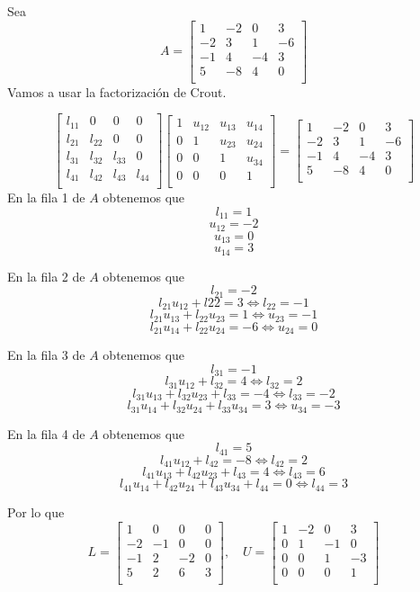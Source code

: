 \begin{ejemplo}
Sea 
\[ A = \begin{bmatrix}
1 & -2 & 0 & 3 \\
-2 & 3 & 1 & -6 \\
-1 & 4 & -4 & 3 \\
5 & -8 & 4 & 0 \\
\end{bmatrix}\]
Vamos a usar la factorización de Crout.

\[ \begin{bmatrix}
l_{11} & 0 & 0 & 0 \\
l_{21} & l_{22} & 0 & 0 \\
l_{31} & l_{32} & l_{33} & 0 \\
l_{41} & l_{42} & l_{43} & l_{44} \\
\end{bmatrix}
\begin{bmatrix}
1 & u_{12} & u_{13} & u_{14} \\
0 & 1 & u_{23} & u_{24} \\
0 & 0 & 1 & u_{34} \\
0 & 0 & 0 & 1 \\
\end{bmatrix}
=
\begin{bmatrix}
1 & -2 & 0 & 3 \\
-2 & 3 & 1 & -6 \\
-1 & 4 & -4 & 3 \\
5 & -8 & 4 & 0 \\
\end{bmatrix}\]
En la fila 1 de $A$ obtenemos que
\[l_{11} = 1\]
\[u_{12}=-2\]
\[u_{13} = 0\] 
\[u_{14} = 3\]

En la fila 2 de $A$ obtenemos que
\[l_{21}=-2\]
\[l_{21}u_{12}+l{22}=3 \Leftrightarrow l_{22}=-1\]
\[l_{21}u_{13}+l_{22}u_{23}=1 \Leftrightarrow u_{23}=-1 \]
\[l_{21}u_{14}+l_{22}u_{24}=-6 \Leftrightarrow u_{24}=0 \]

En la fila 3 de $A$ obtenemos que
\[ l_31 = -1 \]
\[ l_{31}u_{12} + l_{32} = 4 \Leftrightarrow l_{32}=2 \]
\[ l_{31}u_{13}+l_{32}u_{23}+l_{33} = -4 \Leftrightarrow l_{33}=-2 \]
\[l_{31}u_{14}+l_{32}u_{24}+l_{33}u_{34}=3 \Leftrightarrow u_{34}=-3 \]

En la fila 4 de $A$ obtenemos que
\[ l_{41} = 5 \]
\[ l_{41}u_{12}+l_{42}=-8 \Leftrightarrow l_{42}=2 \]
\[ l_{41}u_{13}+l_{42}u_{23}+l_{43}=4 \Leftrightarrow l_{43}=6\]
\[l_{41}u_{14}+l_{42}u_{24}+l_{43}u_{34}+l_{44} = 0 \Leftrightarrow l_{44}=3 \]

Por lo que
\[ L = \begin{bmatrix}
1 & 0 & 0 & 0 \\
-2 & -1 & 0 & 0 \\
-1 & 2 & -2 & 0 \\
5 & 2 & 6 & 3 \\
\end{bmatrix}, \quad
U = \begin{bmatrix}
1 & -2 & 0 & 3 \\
0 & 1 & -1 & 0 \\
0 & 0 & 1 & -3 \\
0 & 0 & 0 & 1 \\
\end{bmatrix}\]
\end{ejemplo}
			
